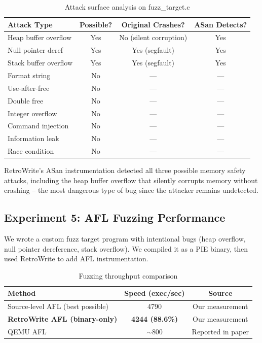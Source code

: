 \documentclass[10pt,a4paper]{article}
\begin{document}
\begin{table}[H]
\centering
\caption{Attack surface analysis on fuzz\_target.c}
\label{tab:attack_analysis}
\small
\begin{tabular}{lccc}
\toprule
\textbf{Attack Type} & \textbf{Possible?} & \textbf{Original Crashes?} & \textbf{ASan Detects?} \\
\midrule
\rowcolor{danger!8} Heap buffer overflow & \textcolor{danger}{Yes} & No (silent corruption) & \textcolor{success}{Yes} \\
\rowcolor{danger!8} Null pointer deref & \textcolor{danger}{Yes} & Yes (segfault) & \textcolor{success}{Yes} \\
\rowcolor{danger!8} Stack buffer overflow & \textcolor{danger}{Yes} & Yes (segfault) & \textcolor{success}{Yes} \\
\midrule
\rowcolor{rowgray} Format string & No & --- & --- \\
Use-after-free & No & --- & --- \\
\rowcolor{rowgray} Double free & No & --- & --- \\
Integer overflow & No & --- & --- \\
\rowcolor{rowgray} Command injection & No & --- & --- \\
Information leak & No & --- & --- \\
\rowcolor{rowgray} Race condition & No & --- & --- \\
\bottomrule
\end{tabular}
\end{table}

RetroWrite's ASan instrumentation detected all three possible memory safety attacks, including the heap buffer overflow that silently corrupts memory without crashing -- the most dangerous type of bug since the attacker remains undetected.

\subsection{Experiment 5: AFL Fuzzing Performance}

We wrote a custom fuzz target program with intentional bugs (heap overflow, null pointer dereference, stack overflow). We compiled it as a PIE binary, then used RetroWrite to add AFL instrumentation.

\begin{table}[H]
\centering
\caption{Fuzzing throughput comparison}
\label{tab:fuzz_results}
\begin{tabular}{lcc}
\toprule
\textbf{Method} & \textbf{Speed (exec/sec)} & \textbf{Source} \\
\midrule
\rowcolor{rowgray} Source-level AFL (best possible) & 4790 & Our measurement \\
\rowcolor{accent!10} \textbf{RetroWrite AFL (binary-only)} & \textbf{4244 (88.6\%)} & Our measurement \\
\rowcolor{rowgray} QEMU AFL & $\sim$800 & Reported in paper \\
\bottomrule
\end{tabular}
\end{table}
\end{document}
